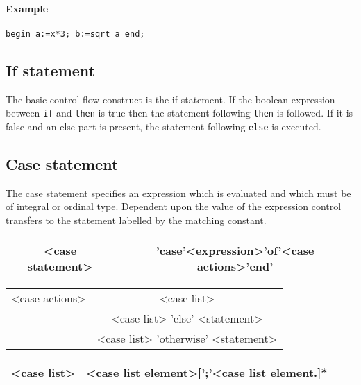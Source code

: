{\paragraph{Example}

\texttt{begin a:=x{*}3; b:=sqrt a end;}


\subsection{If statement}

The basic control flow construct is the if statement. If the boolean expression
between \texttt{if} and \texttt{then} is true then the
statement following \texttt{then} is followed. If it is false and an else part
is present, the statement following \texttt{else} is executed. 


\subsection{Case statement}

The case statement specifies an expression which is evaluated and
which must be of integral or ordinal type. Dependent upon the value of the expression
control transfers to the statement labelled by the matching constant.

\vspace{0.3cm}
{\centering \begin{tabular}{|c|c|}
\hline 
<case statement>&
'case'<expression>'of'<case actions>'end'\\


\hline 
\end{tabular}\par}
\vspace{0.3cm}
\vspace{0.3cm}
{\centering \begin{tabular}{|c|c|}
\hline 
<case actions>&
<case list>\\&
<case list> 'else' <statement>\\&
<case list> 'otherwise' <statement>\\


\hline 
\end{tabular}\par}
\vspace{0.3cm}
\vspace{0.3cm}
{\centering \begin{tabular}{|c|c|}
\hline 
<case list>&
<case list element>{[}';'<case list element.{]}{*}\\
\hline 
\end{tabular}\par}
\vspace{0.3cm}

}
